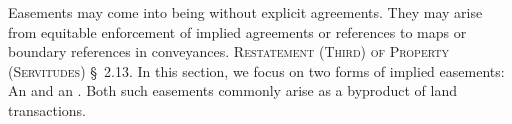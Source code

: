 Easements may come into being without explicit agreements. They may arise from
equitable enforcement of implied agreements or references to maps or boundary
references in conveyances. \textsc{Restatement (Third) of Property (Servitudes)}
\S~2.13. In this section, we focus on two forms of implied easements: An
 and an .
Both such easements commonly arise as a byproduct of land transactions.


